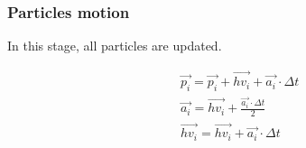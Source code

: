 \subsubsection{Particles motion}

In this stage, all particles are updated.

\[
\begin{split}
&\vec{p_i} = \vec{p_i} + \overrightarrow{hv_i} + \vec{a_i} \cdot \Delta t\\
&\vec{a_i} = \overrightarrow{hv_i} + \frac{\vec{a_i} \cdot \Delta t}{2}\\
&\overrightarrow{hv_i} = \overrightarrow{hv_i} + \vec{a_i} \cdot \Delta t
\end{split}
\]
